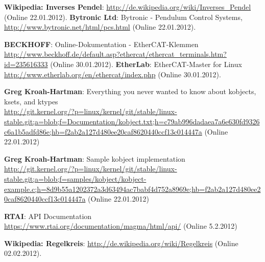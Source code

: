 




\newpage
\begin{thebibliography}{}
 \textbf{Wikipedia: Inverses Pendel}: \url{http://de.wikipedia.org/wiki/Inverses_Pendel} (Online 22.01.2012).
 \textbf{Bytronic Ltd}: Bytronic - Pendulum Control Systems, \url{http://www.bytronic.net/html/pcs.html} (Online 22.01.2012).


 \textbf{BECKHOFF}: Online-Dokumentation - EtherCAT-Klemmen \url{http://www.beckhoff.de/default.asp?ethercat/ethercat_terminals.htm?id=235616333} (Online 30.01.2012).
 \textbf{EtherLab}: EtherCAT-Master for Linux \url{http://www.etherlab.org/en/ethercat/index.php} (Online 30.01.2012).

 \textbf{Greg Kroah-Hartman}: Everything you never wanted to know about kobjects, ksets, and ktypes\\
\url{http://git.kernel.org/?p=linux/kernel/git/stable/linux-stable.git;a=blob;f=Documentation/kobject.txt;h=c79ab996dadaea7a6e630fd9326c6a1b5adfd86e;hb=f2ab2a127d480ee20caf8620440ccf13c014447a} (Online 22.01.2012)

 \textbf{Greg Kroah-Hartman}: Sample kobject implementation\\
\url{http://git.kernel.org/?p=linux/kernel/git/stable/linux-stable.git;a=blob;f=samples/kobject/kobject-example.c;h=8d9b55a1202372a3d63494ac7babf4d752a8969e;hb=f2ab2a127d480ee20caf8620440ccf13c014447a} (Online 22.01.2012)

 \textbf{RTAI}: API Documentation \url{https://www.rtai.org/documentation/magma/html/api/} (Online 5.2.2012)

 \textbf{Wikipedia: Regelkreis}: \url{http://de.wikipedia.org/wiki/Regelkreis} (Online 02.02.2012).
\end{thebibliography}


